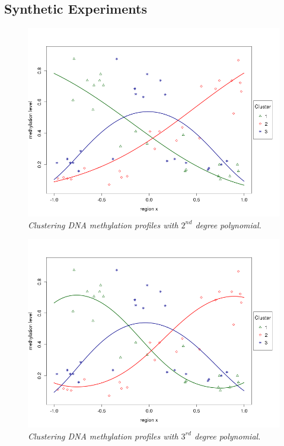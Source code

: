 \subsection{Synthetic Experiments} \label{meth-synth-exp-subsect}

\begin{figure}[!ht]
\begin{center}
 \includegraphics[scale = 0.40]{images/probit2nd.png}
\caption{\emph{Clustering DNA methylation profiles with $2^{nd}$ degree polynomial.}}
\label{probit-2nd-pic}
\end{center}
\end{figure}

\begin{figure}[!ht]
\begin{center}
 \includegraphics[scale = 0.40]{images/probit3rd.png}
\caption{\emph{Clustering DNA methylation profiles with $3^{rd}$ degree polynomial.}}
\label{probit-3rd-pic}
\end{center}
\end{figure}